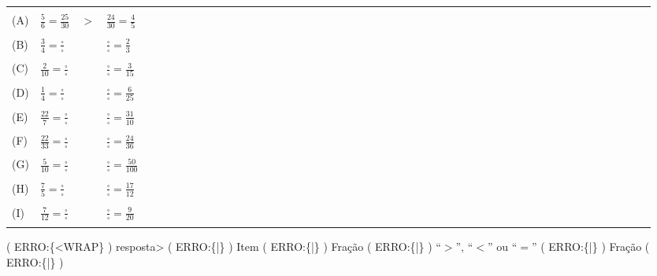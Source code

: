 \documentclass[a4,12pt]{book}
\begin{document}
\begin{center}
  \begin{tabulary}{0.8\textwidth}{*{50}{L}}
    \hline \hline \\
     (A) &  $\frac{5}{6} = \frac{25}{30}$ &   $>$  &  $\frac{24}{30} = \frac{4}{5}$ \\
    \hline \\
     (B) &  $\frac{3}{4} = \frac{\square}{\square}$ &   &  $\frac{\square}{\square} = \frac{2}{3}$ \\
    \hline \\
     (C) &  $\frac{2}{10} = \frac{\square}{\square}$ &   &  $\frac{\square}{\square} = \frac{3}{15}$ \\
    \hline \\
     (D) &  $\frac{1}{4} = \frac{\square}{\square}$ &   &  $\frac{\square}{\square} = \frac{6}{25}$ \\
    \hline \\
     (E) &  $\frac{22}{7} = \frac{\square}{\square}$ &  &  $\frac{\square}{\square} = \frac{31}{10}$ \\
    \hline \\
     (F) &  $\frac{22}{33} = \frac{\square}{\square}$ &   &  $\frac{\square}{\square} = \frac{24}{36}$ \\
    \hline \\
     (G) &  $\frac{5}{10} = \frac{\square}{\square}$ &   &  $\frac{\square}{\square} = \frac{50}{100}$ \\
    \hline \\
     (H) &  $\frac{7}{5} = \frac{\square}{\square}$ &  &  $\frac{\square}{\square} = \frac{17}{12}$ \\
    \hline \\
     (I) &  $\frac{7}{12} = \frac{\square}{\square}$ &  &  $\frac{\square}{\square} = \frac{9}{20}$ \\
    \hline \\
  \end{tabulary}
\end{center}


( ERRO:\{<WRAP\} ) resposta>
( ERRO:\{|\} ) Item ( ERRO:\{|\} ) Fração ( ERRO:\{|\} ) ``$>$'', ``$<$'' ou ``$=$'' ( ERRO:\{|\} ) Fração ( ERRO:\{|\} ) 
\end{document}
